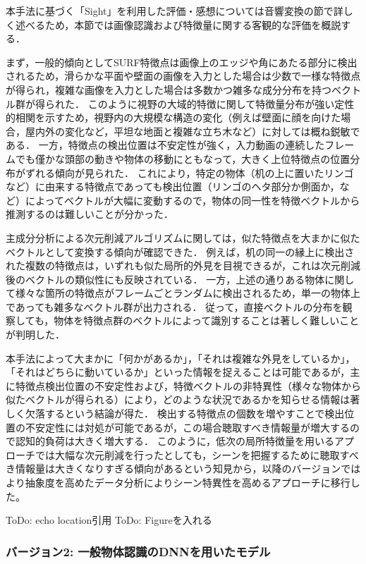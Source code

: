 本手法に基づく「Sight」を利用した評価・感想については音響変換の節で詳しく述べるため，本節では画像認識および特徴量に関する客観的な評価を概説する．

まず，一般的傾向としてSURF特徴点は画像上のエッジや角にあたる部分に検出されるため，滑らかな平面や壁面の画像を入力とした場合は少数で一様な特徴点が得られ，複雑な画像を入力とした場合は多数かつ雑多な成分分布を持つベクトル群が得られた．
このように視野の大域的特徴に関して特徴量分布が強い定性的相関を示すため，視野内の大規模な構造の変化（例えば壁面に顔を向けた場合，屋内外の変化など，平坦な地面と複雑な立ち木など）に対しては概ね鋭敏である．
一方，特徴点の検出位置は不安定性が強く，入力動画の連続したフレームでも僅かな頭部の動きや物体の移動にともなって，大きく上位特徴点の位置分布がずれる傾向が見られた．
これにより，特定の物体（机の上に置いたリンゴなど）に由来する特徴点であっても検出位置（リンゴのヘタ部分か側面か，など）によってベクトルが大幅に変動するので，物体の同一性を特徴ベクトルから推測するのは難しいことが分かった．

主成分分析による次元削減アルゴリズムに関しては，似た特徴点を大まかに似たベクトルとして変換する傾向が確認できた．
例えば，机の同一の縁上に検出された複数の特徴点は，いずれも似た局所的外見を目視できるが，これは次元削減後のベクトルの類似性にも反映されている．
一方，上述の通りある物体に関して様々な箇所の特徴点がフレームごとランダムに検出されるため，単一の物体上であっても雑多なベクトル群が出力される．
従って，直接ベクトルの分布を観察しても，物体を特徴点群のベクトルによって識別することは著しく難しいことが判明した．

本手法によって大まかに「何かがあるか」，「それは複雑な外見をしているか」，「それはどちらに動いているか」といった情報を捉えることは可能であるが，主に特徴点検出位置の不安定性および，特徴ベクトルの非特異性（様々な物体から似たベクトルが得られる）により，どのような状況であるかを知らせる情報は著しく欠落するという結論が得た．
検出する特徴点の個数を増やすことで検出位置の不安定性には対処が可能であるが，この場合聴取すべき情報量が増大するので認知的負荷は大きく増大する．
このように，低次の局所特徴量を用いるアプローチでは大幅な次元削減を行ったとしても，シーンを把握するために聴取すべき情報量は大きくなりすぎる傾向があるという知見から，以降のバージョンではより抽象度を高めたデータ分析によりシーン特異性を高めるアプローチに移行した。

ToDo: echo location引用
ToDo: Figureを入れる

\newpage

\subsubsection{バージョン2: 一般物体認識のDNNを用いたモデル}

